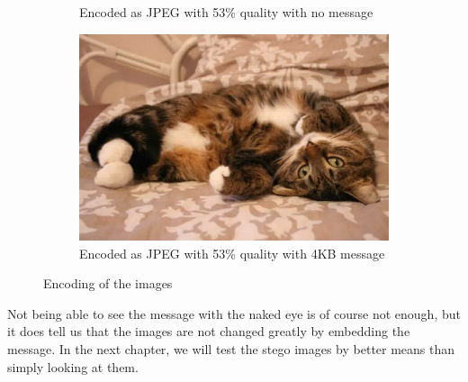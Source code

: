 \begin{figure}[H]
\begin{subfigure}[b]{0.45\textwidth}
		\caption{Encoded as JPEG with 53\% quality with no message}
		\label{fig:catJPEGNoMessage}
    \end{subfigure}
    \begin{subfigure}[b]{0.45\textwidth}
        \includegraphics[width=\textwidth]{figures/catToTestWithMessage.jpeg}
		\caption{Encoded as JPEG with 53\% quality with 4KB message}
		\label{fig:catJPEGMessage}
    \end{subfigure}
    \caption{Encoding of the images \citep{FlickrImageCat}}
    \label{fig:ResultEncoding}
\end{figure}

Not being able to see the message with the naked eye is of course not enough, but it does tell us that the images are not changed greatly by embedding the message. In the next chapter, we will test the stego images by better means than simply looking at them. 